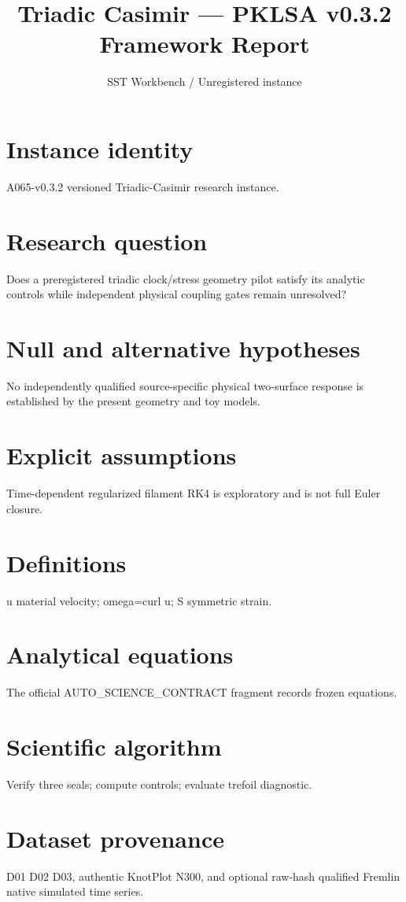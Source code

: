 \documentclass[10pt,a4paper]{article}
\title{Triadic Casimir --- PKLSA v0.3.2 Framework Report}
\author{SST Workbench / Unregistered instance}
\begin{document}
\maketitle
\section{Instance identity}
A065-v0.3.2 versioned Triadic-Casimir research instance.
\section{Research question}
Does a preregistered triadic clock/stress geometry pilot satisfy its analytic controls while independent physical coupling gates remain unresolved?
\section{Null and alternative hypotheses}
No independently qualified source-specific physical two-surface response is established by the present geometry and toy models.
\section{Explicit assumptions}
Time-dependent regularized filament RK4 is exploratory and is not full Euler closure.
\section{Definitions}
u material velocity; omega=curl u; S symmetric strain.
\section{Analytical equations}
The official AUTO\_SCIENCE\_CONTRACT fragment records frozen equations.

\section{Scientific algorithm}
Verify three seals; compute controls; evaluate trefoil diagnostic.
\section{Dataset provenance}
D01 D02 D03, authentic KnotPlot N300, and optional raw-hash qualified Fremlin native simulated time series.
\end{document}
